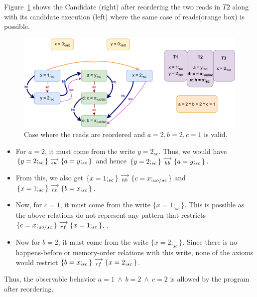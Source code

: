         Figure~\ref{reord_counter:example1(b)} shows the Candidate (right) after reordering the two reads in $T2$ along with its candidate execution (left) where the same case of reads(orange box) is possible. 
        \begin{figure}[H]
            \centering
            \includegraphics[scale=0.7]{7.CounterExamples/ReorderingCandidate/Example0R(Rsc-Ruo,sc).pdf}
            \caption{Case where the reads are reordered and $a = 2 , b = 2, c = 1$ is valid.}
            \label{reord_counter:example1(b)}
        \end{figure}

        \begin{itemize}
            \item For $a=2$, it must come from the write $y=2_{sc}$. 
            Thus, we would have $\{y=2;_{sc}\}\stackrel{\longrightarrow}{_{sw}}\{a=y;_{sc}\}$ and hence $\{y=2;_{sc}\}\stackrel{\longrightarrow}{_{hb}}\{a=y;_{sc}\}$.
            \item From this, we also get $\{x=1;_{sc}\}\stackrel{\longrightarrow}{_{hb}}\{c=x;_{uo/sc}\}$ and $\{x=1;_{sc}\}\stackrel{\longrightarrow}{_{hb}}\{b=x;_{sc}\}$.
            \item Now, for $c=1$, it must come from the write $\{x=1;_{sc}\}$. 
            This is possible as the above relations do not represent any pattern that restricts $\{c=x;_{uo/sc}\}\stackrel{\longrightarrow}{_{rf}}\{x=1;_{sc}\}$. .  
            \item Now for $b=2$, it must come from the write $\{x=2;_{sc}\}$.
            Since there is no happens-before or memory-order relations with this write, none of the axioms would restrict $\{b=x;_{sc}\}\stackrel{\longrightarrow}{_{rf}}\{x=2;_{sc}\}$.        
        \end{itemize}
        Thus, the observable behavior $a=1 \ \wedge \ b=2 \ \wedge \ c=2$ is allowed by the program after reordering. 
        
    
